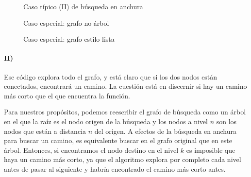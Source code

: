 \documentclass{aitemplate}
\begin{document}
\begin{figure}[hbtp]
\centering
{}
\caption{Caso típico (II) de búsqueda en anchura}
\end{figure}


\begin{figure}[hbtp]
\centering
{}
\caption{Caso especial: grafo no árbol}
\end{figure}

\begin{figure}[hbtp]
\centering
{}
\caption{Caso especial: grafo estilo lista}
\end{figure}

\paragraph{II)} Ese código explora todo el grafo, y está claro que si los dos nodos están conectados, encontrará un camino. La cuestión está en discernir si hay un camino más corto que el que encuentra la función.

Para nuestros propósitos, podemos reescribir el grafo de búsqueda como un árbol en el que la raíz es el nodo origen de la búsqueda y los nodos a nivel $n$ son los nodos que están a distancia $n$ del origen. A efectos de la búsqueda en anchura para buscar un camino, es equivalente buscar en el grafo original que en este árbol. Entonces, si encontramos el nodo destino en el nivel $k$ es imposible que haya un camino más corto, ya que el algoritmo explora por completo cada nivel antes de pasar al siguiente y habría encontrado el camino más corto antes.
\end{document}
